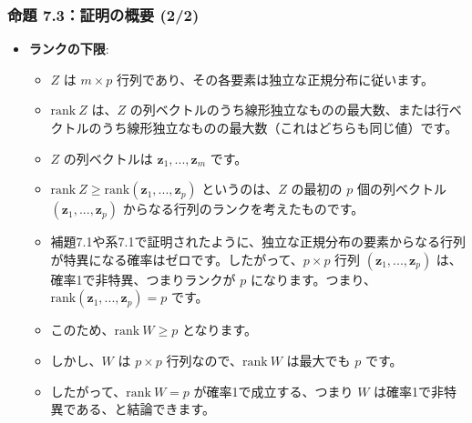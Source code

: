 \documentclass{beamer}
\begin{document}
\begin{frame}
\frametitle{命題 7.3：証明の概要 (2/2)}
\begin{itemize}
    \item \textbf{ランクの下限}:
    \begin{itemize}
        \item $Z$ は $m \times p$ 行列であり、その各要素は独立な正規分布に従います。
        \item $\text{rank}~Z$ は、$Z$ の列ベクトルのうち線形独立なものの最大数、または行ベクトルのうち線形独立なものの最大数（これはどちらも同じ値）です。
        \item $Z$ の列ベクトルは $\bm{z}_1,...,\bm{z}_m$ です。
        \item $\text{rank}~Z\ge\text{rank}(\bm{z}_1,...,\bm{z}_p)$ というのは、$Z$ の最初の $p$ 個の列ベクトル $(\bm{z}_1,...,\bm{z}_p)$ からなる行列のランクを考えたものです。
        \item 補題7.1や系7.1で証明されたように、独立な正規分布の要素からなる行列が特異になる確率はゼロです。したがって、$p \times p$ 行列 $(\bm{z}_1,...,\bm{z}_p)$ は、確率1で非特異、つまりランクが $p$ になります。つまり、$\text{rank}(\bm{z}_1,...,\bm{z}_p)=p$ です。
        \item このため、$\text{rank}~W\ge p$ となります。
        \item しかし、$W$ は $p \times p$ 行列なので、$\text{rank}~W$ は最大でも $p$ です。
        \item したがって、$\text{rank}~W=p$ が確率1で成立する、つまり $W$ は確率1で非特異である、と結論できます。
    \end{itemize}
\end{itemize}
\end{frame}

\end{document}
